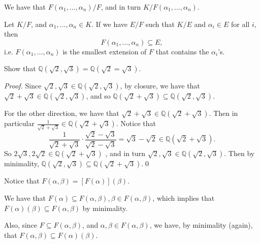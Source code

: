\documentclass[notoc,notitlepage]{tufte-book}
\begin{document}
\begin{note}
  We have that $F(\alpha_1, \ldots, \alpha_n) / F$, and in turn $K / F(\alpha_1, \ldots, \alpha_n)$.
\end{note}

\begin{remark}[Minimality]\label{remark:minimality_of_an_extension}
  Let $K / F$, and $\alpha_1, \ldots, \alpha_n \in K$. If we have $E / F$ such that $K / E$ and
  $\alpha_i \in E$ for all $i$, then
  \begin{equation*}
    F(\alpha_1, \ldots, \alpha_n) \subseteq E,
  \end{equation*}
  i.e. $F(\alpha_1, \ldots, \alpha_n)$ is the smallest extension of $F$ that contains the $\alpha_i$'s.
\end{remark}

\begin{eg}
  Show that $\mathbb{Q}(\sqrt{2}, \sqrt{3}) = \mathbb{Q}(\sqrt{2} = \sqrt{3})$.
\end{eg}

\begin{proof}
  Since $\sqrt{2}, \sqrt{3} \in \mathbb{Q}(\sqrt{2}, \sqrt{3})$, by closure, we have that
  $\sqrt{2} + \sqrt{3} \in \mathbb{Q}(\sqrt{2}, \sqrt{3})$, and so $\mathbb{Q}(\sqrt{2} + \sqrt{3}) 
  \subseteq \mathbb{Q}(\sqrt{2}, \sqrt{3})$.

  For the other direction, we have that $\sqrt{2} + \sqrt{3} \in \mathbb{Q}(\sqrt{2} + \sqrt{3})$.
  Then in particular $\frac{1}{\sqrt{2} + \sqrt{3}} \in \mathbb{Q}(\sqrt{2} + \sqrt{3})$. Notice that
  \begin{equation*}
    \frac{1}{\sqrt{2} + \sqrt{3}} \cdot \frac{\sqrt{2} - \sqrt{3}}{\sqrt{2} - \sqrt{3}} 
      = \sqrt{3} - \sqrt{2} \in \mathbb{Q}(\sqrt{2} + \sqrt{3}).
  \end{equation*}
  So $2 \sqrt{3}, 2 \sqrt{2} \in \mathbb{Q}(\sqrt{2} + \sqrt{3})$ , and in turn
  $\sqrt{2}, \sqrt{3} \in \mathbb{Q}(\sqrt{2}, \sqrt{3})$. Then by minimality, 
  $\mathbb{Q}(\sqrt{2}, \sqrt{3}) \subseteq \mathbb{Q}(\sqrt{2} + \sqrt{3})$.\qed\
\end{proof}

\begin{remark}
  Notice that $F(\alpha, \beta) = \left[ F(\alpha) \right](\beta)$.

  We have that $F(\alpha) \subseteq F(\alpha, \beta), \beta \in F(\alpha, \beta)$, which implies that
  $F(\alpha)(\beta) \subseteq F(\alpha, \beta)$ by minimality.

  Also, since $F \subseteq F(\alpha, \beta)$, and $\alpha, \beta \in F(\alpha, \beta)$, we have, by
  minimality (again), that $F(\alpha, \beta) \subseteq F(\alpha)(\beta)$.
\end{remark}
\end{document}
